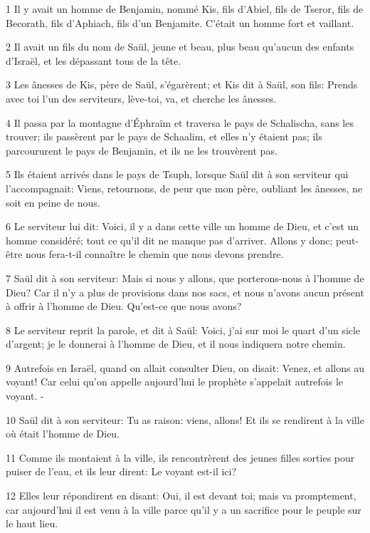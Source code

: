 \par 1 Il y avait un homme de Benjamin, nommé Kis, fils d'Abiel, fils de Tseror, fils de Becorath, fils d'Aphiach, fils d'un Benjamite. C'était un homme fort et vaillant.
\par 2 Il avait un fils du nom de Saül, jeune et beau, plus beau qu'aucun des enfants d'Israël, et les dépassant tous de la tête.
\par 3 Les ânesses de Kis, père de Saül, s'égarèrent; et Kis dit à Saül, son fils: Prends avec toi l'un des serviteurs, lève-toi, va, et cherche les ânesses.
\par 4 Il passa par la montagne d'Éphraïm et traversa le pays de Schalischa, sans les trouver; ils passèrent par le pays de Schaalim, et elles n'y étaient pas; ils parcoururent le pays de Benjamin, et ils ne les trouvèrent pas.
\par 5 Ils étaient arrivés dans le pays de Tsuph, lorsque Saül dit à son serviteur qui l'accompagnait: Viens, retournons, de peur que mon père, oubliant les ânesses, ne soit en peine de nous.
\par 6 Le serviteur lui dit: Voici, il y a dans cette ville un homme de Dieu, et c'est un homme considéré; tout ce qu'il dit ne manque pas d'arriver. Allons y donc; peut-être nous fera-t-il connaître le chemin que nous devons prendre.
\par 7 Saül dit à son serviteur: Mais si nous y allons, que porterons-nous à l'homme de Dieu? Car il n'y a plus de provisions dans nos sacs, et nous n'avons aucun présent à offrir à l'homme de Dieu. Qu'est-ce que nous avons?
\par 8 Le serviteur reprit la parole, et dit à Saül: Voici, j'ai sur moi le quart d'un sicle d'argent; je le donnerai à l'homme de Dieu, et il nous indiquera notre chemin.
\par 9 Autrefois en Israël, quand on allait consulter Dieu, on disait: Venez, et allons au voyant! Car celui qu'on appelle aujourd'hui le prophète s'appelait autrefois le voyant. -
\par 10 Saül dit à son serviteur: Tu as raison: viens, allons! Et ils se rendirent à la ville où était l'homme de Dieu.
\par 11 Comme ils montaient à la ville, ils rencontrèrent des jeunes filles sorties pour puiser de l'eau, et ils leur dirent: Le voyant est-il ici?
\par 12 Elles leur répondirent en disant: Oui, il est devant toi; mais va promptement, car aujourd'hui il est venu à la ville parce qu'il y a un sacrifice pour le peuple sur le haut lieu.

